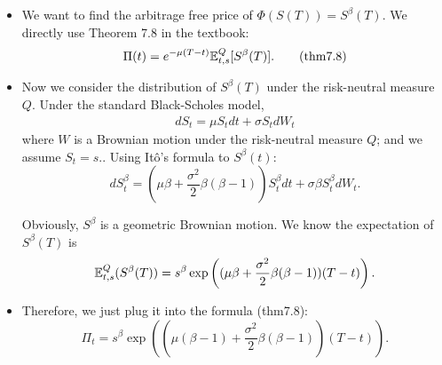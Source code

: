 \begin{example}
	\begin{itemize}
		\item We want to find the arbitrage free price of $\Phi(S(T)) = S^\beta(T)$. We directly use Theorem 7.8 in the textbook:
		\begin{align*}
		\Pi(t) = e^{-\mu(T-t)} \mathbb{E}_{t,s}^Q [ S^\beta(T) ]. \tag{thm7.8}
		\end{align*} 
		
		\item Now we consider the distribution of $S^\beta(T)$ under the risk-neutral measure $Q$. Under the standard Black-Scholes model, 
		\begin{align*}
		d S_t = \mu S_t d t + \sigma S_t d W_t \tag{7.43-7.44}
		\end{align*}
		where $W$ is a Brownian motion under the risk-neutral measure $Q$; and we assume $S_t =s$.. Using It\^o's formula to $S^\beta(t)$:
		$$d S^\beta_t = \left(\mu \beta  + \frac{\sigma^2}{2} \beta (\beta - 1)\right) S_t^\beta dt + \sigma \beta S^\beta_t dW_t.$$
		
		Obviously, $S^\beta$ is a geometric Brownian motion. We know the expectation of $S^\beta(T)$ is 
		$$\mathbb{E}^Q_{t,s}(S^\beta(T)) = s^\beta \exp\left( (\mu \beta  + \frac{\sigma^2}{2} \beta (\beta - 1)) (T-t) \right).$$
		
		\item Therefore, we just plug it into the formula (thm7.8):
		$$\Pi_t = s^\beta \exp\left( (\mu (\beta-1)  + \frac{\sigma^2}{2} \beta (\beta - 1)) (T-t) \right).$$ 
	\end{itemize}
\end{example}

